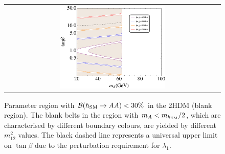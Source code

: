 \documentclass[preprintnumbers,superscriptaddress,nofootinbib,aps,prd,floatfix]{revtex4}
\begin{document}
\begin{figure}[htbp]
\begin{center}
\begin{tabular}{c}
\includegraphics[width=0.5\textwidth,natwidth=610,natheight=642]{Figures/pheno/plot_Brhaa_2HDM} 
\end{tabular}
\caption{Parameter region with ${\cal B}(h_{\rm SM}\to AA)<30\%$ in the 2HDM (blank region). The blank belts in the region with $m_A < m_{h_{\rm SM}}/2$, which are characterised by different boundary colours, are yielded by different $m_{12}^2$ values. The black dashed line represents a universal upper limit on $\tan\beta$ due to the perturbation requirement for $\lambda_1$.}
\label{fig:Brhaa_2HDM} 
\end{center}
\end{figure}
\end{document}
